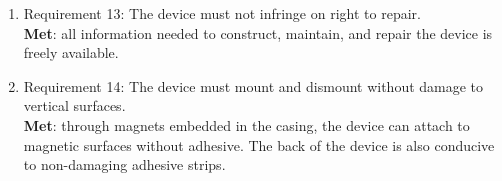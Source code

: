 \begin{enumerate}
            \textbf{Met}: the device costs approximately \$110 USD
            to construct, including the ADS-B SDR. By using only
            free APIs, the device incurs no recurring costs apart
            from energy use.
      \item Requirement 13: The device must not infringe on right to repair. \\
            \textbf{Met}: all information needed to construct, maintain,
            and repair the device is freely available.
      \item Requirement 14: The device must mount and dismount without
            damage to vertical surfaces. \\
            \textbf{Met}: through magnets embedded in the casing, the
            device can attach to magnetic surfaces without adhesive.
            The back of the device is also conducive to non-damaging
            adhesive strips.
\end{enumerate}
